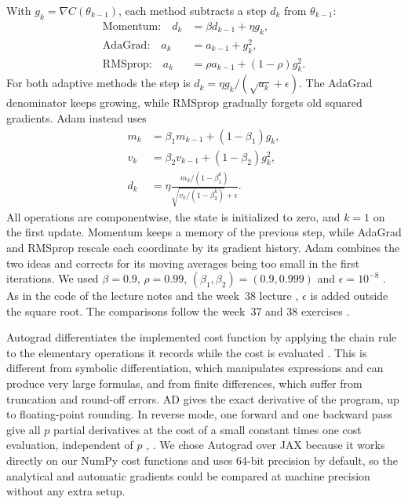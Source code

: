 \documentclass[aps,prb,reprint,superscriptaddress,nofootinbib,longbibliography,floatfix]{revtex4-2}
\begin{document}
With $g_k=\nabla C(\theta_{k-1})$, each method subtracts a step $d_k$ from $\theta_{k-1}$:
\begin{align}
\text{Momentum:}\quad d_k&=\beta d_{k-1}+\eta g_k,\nonumber\\
\text{AdaGrad:}\quad a_k&=a_{k-1}+g_k^2,\nonumber\\
\text{RMSprop:}\quad a_k&=\rho a_{k-1}+(1-\rho)g_k^2.
\end{align}
For both adaptive methods the step is $d_k=\eta g_k/(\sqrt{a_k}+\epsilon)$. The AdaGrad denominator keeps growing, while RMSprop gradually forgets old squared gradients. Adam instead uses
\begin{align}
m_k&=\beta_1m_{k-1}+(1-\beta_1)g_k,\nonumber\\
v_k&=\beta_2v_{k-1}+(1-\beta_2)g_k^2,\nonumber\\
d_k&=\eta\frac{m_k/(1-\beta_1^k)}{\sqrt{v_k/(1-\beta_2^k)}+\epsilon}.
\end{align}
All operations are componentwise, the state is initialized to zero, and $k=1$ on the first update. Momentum \cite{Polyak1964} keeps a memory of the previous step, while AdaGrad \cite{Duchi2011} and RMSprop \cite{Tieleman2012} rescale each coordinate by its gradient history. Adam \cite{Kingma2015} combines the two ideas and corrects for its moving averages being too small in the first iterations. We used $\beta=0.9$, $\rho=0.99$, $(\beta_1,\beta_2)=(0.9,0.999)$ and $\epsilon=10^{-8}$ \cite[Secs.~4.6 and 4.8--4.11]{HjorthJensen2026}. As in the code of the lecture notes \cite[Sec.~4.12]{HjorthJensen2026} and the week~38 lecture \cite{Week38Tuesday}, $\epsilon$ is added outside the square root. The comparisons follow the week~37 and 38 exercises \cite{Exercises37,Exercises38}.

Autograd differentiates the implemented cost function by applying the chain rule to the elementary operations it records while the cost is evaluated \cite{Maclaurin2015,Baydin2018}. This is different from symbolic differentiation, which manipulates expressions and can produce very large formulas, and from finite differences, which suffer from truncation and round-off errors. AD gives the exact derivative of the program, up to floating-point rounding. In reverse mode, one forward and one backward pass give all $p$ partial derivatives at the cost of a small constant times one cost evaluation, independent of $p$ \cite{Baydin2018}, \cite[Sec.~4.14]{HjorthJensen2026}. We chose Autograd over JAX because it works directly on our NumPy cost functions and uses 64-bit precision by default, so the analytical and automatic gradients could be compared at machine precision without any extra setup.
\end{document}
